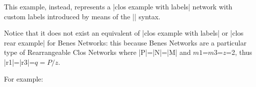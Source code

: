 \documentclass{ltxdoc}
\begin{document}
This example, instead, represents a |clos example with labels| network with custom labels introduced by means of the |\tikzset| syntax.

\begin{codeexample}[]
\end{codeexample}

Notice that it does not exist an equivalent of |clos example with labels| or |clos rear example| for Benes Networks: this because Benes Networks are a particular type of Rearrangeable Clos Networks where |P|=|N|=|M| and $m1$=$m3$=$z$=2, thus |r1|=|r3|=$q=P/z$.

For example:

\begin{codeexample}[]
\end{codeexample}

\begin{codeexample}[]
\begin{tikzpicture}
    \node[set math mode labels=true,clos example with labels] {};
\end{tikzpicture}
\end{codeexample}

\clearpage
\appendix
\end{document}

